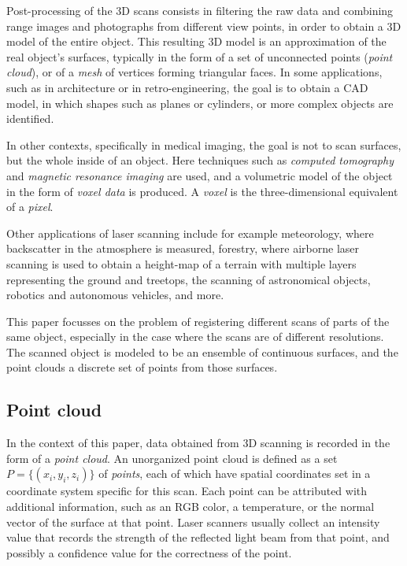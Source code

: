 Post-processing of the 3D scans consists in filtering the raw data and combining range images and photographs from different view points, in order to obtain a 3D model of the entire object. This resulting 3D model is an approximation of the real object's surfaces, typically in the form of a set of unconnected points (\emph{point cloud}), or of a \emph{mesh} of vertices forming triangular faces. In some applications, such as in architecture or in retro-engineering, the goal is to obtain a CAD model, in which shapes such as planes or cylinders, or more complex objects are identified. 

In other contexts, specifically in medical imaging, the goal is not to scan surfaces, but the whole inside of an object. Here techniques such as \emph{computed tomography} and \emph{magnetic resonance imaging} are used, and a volumetric model of the object in the form of \emph{voxel data} is produced. A \emph{voxel} is the three-dimensional equivalent of a \emph{pixel}.

Other applications of laser scanning include for example meteorology, where backscatter in the atmosphere is measured, forestry, where airborne laser scanning is used to obtain a height-map of a terrain with multiple layers representing the ground and treetops, the scanning of astronomical objects, robotics \cite{Bibe2003} and autonomous vehicles, and more.

This paper focusses on the problem of registering different scans of parts of the same object, especially in the case where the scans are of different resolutions. The scanned object is modeled to be an ensemble of continuous surfaces, and the point clouds a discrete set of points from those surfaces. 


\subsection{Point cloud}
In the context of this paper, data obtained from 3D scanning is recorded in the form of a \emph{point cloud}. An unorganized point cloud is defined as a set $P = \{ (x_i, y_i, z_i) \}$ of \emph{points}, each of which have spatial coordinates set in a coordinate system specific for this scan. Each point can be attributed with additional information, such as an RGB color, a temperature, or the normal vector of the surface at that point. Laser scanners usually collect an intensity value that records the strength of the reflected light beam from that point, and possibly a confidence value for the correctness of the point.

